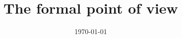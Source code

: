 \newcommand{\smath}[1]{ {\setlength{\mathindent}{0cm} \begin{equation} #1\end{equation}}%
}

\DeclarePairedDelimiter\abs{\lvert}{\rvert}%
\DeclarePairedDelimiter\norm{\lVert}{\rVert}%
\makeatletter
\let\oldabs\abs
\def\abs{\@ifstar{\oldabs}{\oldabs*}}
%
\let\oldnorm\norm
\def\norm{\@ifstar{\oldnorm}{\oldnorm*}}
\makeatother



	\title{The formal point of view}
	\date{\today}

	\maketitle
	
	\newpage
	\tableofcontents
	\newpage
	\raggedbottom



